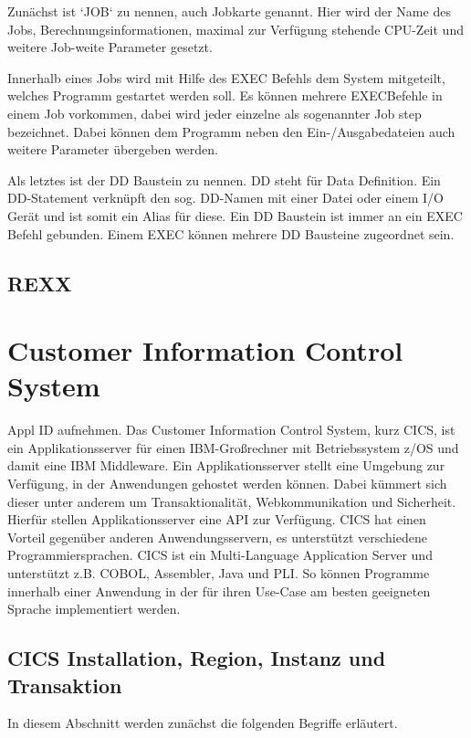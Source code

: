 Zunächst ist `JOB` zu nennen, auch Jobkarte genannt.
Hier wird der Name des Jobs, Berechnungsinformationen, maximal zur Verfügung stehende CPU-Zeit und weitere Job-weite Parameter gesetzt.

Innerhalb eines Jobs wird mit Hilfe des \glqq EXEC\grqq{} Befehls dem System mitgeteilt, welches Programm gestartet werden soll.
Es können mehrere \glqq EXEC\dq  Befehle in einem Job vorkommen, dabei wird jeder einzelne als sogenannter \glqq Job step\grqq{} bezeichnet.
Dabei können dem Programm neben den Ein-/Ausgabedateien auch weitere Parameter übergeben werden.

Als letztes ist der \glqq DD\grqq{} Baustein zu nennen.
\glqq DD\grqq{} steht für Data Definition.
Ein DD-Statement verknüpft den sog. DD-Namen mit einer Datei oder einem I/O Gerät und ist somit ein Alias für diese.
Ein \glqq DD\grqq{} Baustein ist immer an ein \glqq EXEC\grqq{} Befehl gebunden.
Einem \glqq EXEC\grqq{} können mehrere \glqq DD\grqq{} Bausteine zugeordnet sein. 
\cite{Ebbers.2011}

\subsection{REXX}


\section{Customer Information Control System}\label{cics} Appl ID aufnehmen.
Das Customer Information Control System, kurz CICS, ist ein Applikationsserver für einen IBM-Großrechner mit Betriebssystem z/OS und damit eine IBM Middleware.
Ein Applikationsserver stellt eine Umgebung zur Verfügung, in der Anwendungen gehostet werden können.
Dabei kümmert sich dieser unter anderem um Transaktionalität, Webkommunikation und Sicherheit.
Hierfür stellen Applikationsserver eine API zur Verfügung.
CICS hat einen Vorteil gegenüber anderen Anwendungsservern, es unterstützt verschiedene Programmiersprachen.
CICS ist ein Multi-Language Application Server und unterstützt z.B. COBOL, Assembler, Java und PLI.
So können Programme innerhalb einer Anwendung in der für ihren Use-Case am besten geeigneten Sprache implementiert werden.
\cite{Rayns.2011}

\subsection{CICS Installation, Region, Instanz und Transaktion}
In diesem Abschnitt werden zunächst die folgenden Begriffe erläutert.


